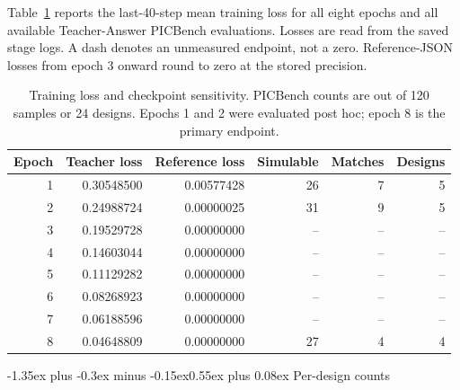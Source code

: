 \documentclass[11pt]{article}
\makeatletter
\renewcommand\section{\@startsection{section}{1}{\z@}%
  {-1.35ex plus -0.3ex minus -0.15ex}{0.55ex plus 0.08ex}%
  {\normalfont\large\bfseries}}
\makeatother
\begin{document}
Table~\ref{tab:checkpoints} reports the last-40-step mean training loss for all eight epochs and all available Teacher-Answer PICBench evaluations. Losses are read from the saved stage logs. A dash denotes an unmeasured endpoint, not a zero. Reference-JSON losses from epoch 3 onward round to zero at the stored precision.

\begin{table}[H]
\centering
\caption{Training loss and checkpoint sensitivity. PICBench counts are out of 120 samples or 24 designs. Epochs 1 and 2 were evaluated post hoc; epoch 8 is the primary endpoint.}
\label{tab:checkpoints}
\begin{small}
\begin{tabular}{rrrrrr}
\toprule
Epoch & Teacher loss & Reference loss & Simulable & Matches & Designs \\
\midrule
1 & 0.30548500 & 0.00577428 & 26 & 7 & 5 \\
2 & 0.24988724 & 0.00000025 & 31 & 9 & 5 \\
3 & 0.19529728 & 0.00000000 & -- & -- & -- \\
4 & 0.14603044 & 0.00000000 & -- & -- & -- \\
5 & 0.11129282 & 0.00000000 & -- & -- & -- \\
6 & 0.08268923 & 0.00000000 & -- & -- & -- \\
7 & 0.06188596 & 0.00000000 & -- & -- & -- \\
8 & 0.04648809 & 0.00000000 & 27 & 4 & 4 \\
\bottomrule
\end{tabular}
\end{small}
\end{table}

\section{Per-design counts}
\label{app:perdesign}
\end{document}
